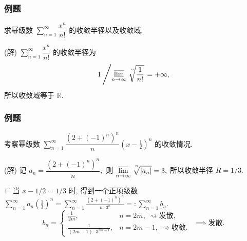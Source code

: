 
\begin{frame}
\frametitle{例题}

\begin{eg}
求幂级数 $\displaystyle \sum_{n=1}^{\infty} \dfrac{x^n}{n!}$ 的收敛半径以及收敛域.
\end{eg}

\pause

\startproof[bg=yellow, fg=red](解)
$\displaystyle \sum_{n=1}^{\infty} \dfrac{x^n}{n!}$ 的收敛半径为
\[
1 \left/ \varlimsup_{n\to\infty} \sqrt[\leftroot{-3}\uproot{7}n]{\frac{1}{n!}} \right. = +\infty,
\]
\pause
所以收敛域等于 $\mathbb{R}.$

\end{frame}


\begin{frame}
\frametitle{例题}

\begin{eg}
考察幂级数 $\displaystyle \sum_{n=1}^{\infty} \dfrac{(2 + (-1)^n)^n}{n} \left( x - \frac{1}{2} \right)^n$ 的收敛情况.
\end{eg}

\pause
\vspace{0.5em}

\startproof[bg=yellow, fg=red](解)
记 $a_n = \dfrac{(2 + (-1)^n)^n}{n},$ 则 $\displaystyle \varlimsup_{n\to\infty} \sqrt[\leftroot{-3}\uproot{7}n]{|a_n|} = 3,$ 所以收敛半径 $R = 1/3.$

\pause
\vspace{0.5em}

$1^{\circ}$ 当 $x - 1/2 = 1/3$ 时, 得到一个正项级数 $\displaystyle \sum_{n=1}^{\infty} a_n \left( \frac{1}{3} \right)^n = \sum_{n=1}^{\infty} \frac{(2 + (-1)^n)^n}{n \cdot 3^n} =: \sum_{n=1}^{\infty} b_n.$
\[
b_n = \begin{cases}
\frac{1}{2m}, & n = 2m, ~ \rightsquigarrow \text{发散}, \\ \frac{1}{(2m - 1) \cdot 3^{2m - 1}}, & n = 2m - 1, ~ \rightsquigarrow \text{收敛}.
\end{cases}
~~ \implies \text{发散}.
\]

\end{frame}


